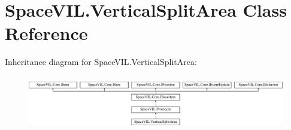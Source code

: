\hypertarget{class_space_v_i_l_1_1_vertical_split_area}{}\section{Space\+V\+I\+L.\+Vertical\+Split\+Area Class Reference}
\label{class_space_v_i_l_1_1_vertical_split_area}
Inheritance diagram for Space\+V\+I\+L.\+Vertical\+Split\+Area\+:\begin{figure}[H]
\begin{center}
\leavevmode
\includegraphics[height=2.421622cm]{class_space_v_i_l_1_1_vertical_split_area}
\end{center}
\end{figure}
